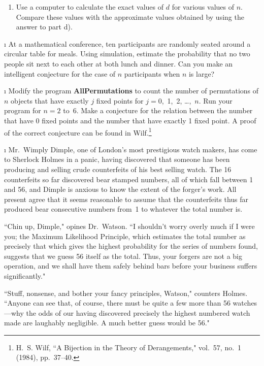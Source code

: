 \begin{LJSItem}
\begin{enumerate}
\item Use a computer to calculate the exact values of $d$ for various values of $n$. 
Compare these values with the approximate values obtained by using the answer to part
d).
\end{enumerate}

\i\label{exer 3.1.20}  At a mathematical conference,
ten participants are randomly seated around a circular table for meals.  Using
simulation, estimate the probability that no two people sit next to each other at both
lunch and dinner.  Can you make an intelligent conjecture for the case of $n$
participants when $n$ is large?

\i\label{exer 3.1.21} Modify the program {\bf AllPermutations} to count the number
of permutations of $n$ objects that have exactly $j$ fixed points for $j = 0$,~1,~2,
\dots,~$n$.  Run your program for $n = 2$ to~6.  Make a conjecture for the relation
between the number that have 0 fixed points and the number that have exactly 1 fixed
point.  A proof of the correct conjecture can be found in Wilf.\footnote{H.~S.
Wilf, ``A Bijection in the Theory of Derangements,"  vol.~57, no.~1
(1984), pp.~37--40. }

\i\label{exer 3.1.22} Mr.~Wimply Dimple, one of London's most prestigious watch
makers, has come to Sherlock Holmes in a panic, having discovered that
someone has been producing and selling crude counterfeits of his best selling
watch.  The 16 counterfeits so far discovered bear stamped numbers, all
of which fall between 1 and 56, and Dimple is anxious to know the extent of the forger's work.  All
present agree that it seems reasonable to assume that the counterfeits thus far produced bear
consecutive numbers from~1 to whatever the total number is.
\par
``Chin up, Dimple," opines Dr.\ Watson.  ``I shouldn't worry overly much if I were you;
the Maximum Likelihood Principle, which estimates the total
number as precisely that which gives the highest probability for the series of numbers found,
suggests that we guess 56 itself as the total.  Thus, your forgers are not a big operation, and we
shall have them safely behind bars before your business suffers significantly."
\par
``Stuff, nonsense, and bother your fancy principles, Watson," counters Holmes. 
``Anyone can see that, of course, there must be quite a few more than 56 watches---why
the odds of our having discovered precisely the highest numbered watch made are
laughably negligible.  A much better guess would be  56."


\end{LJSItem}
